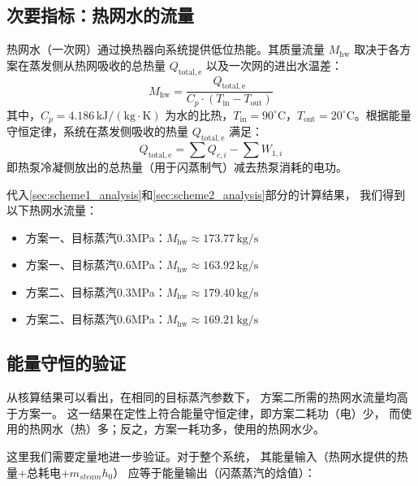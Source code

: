 \documentclass{thuemp}
\begin{document}
\subsection{次要指标：热网水的流量}
热网水（一次网）通过换热器向系统提供低位热能。其质量流量 $M_{\mathrm{hw}}$ 取决于各方案在蒸发侧从热网吸收的总热量 $Q_{\mathrm{total,e}}$ 以及一次网的进出水温差：\begin{equation}M_{\mathrm{hw}} = \frac{Q_{\mathrm{total,e}}}{C_p \cdot (T_{\mathrm{in}} - T_{\mathrm{out}})}\end{equation}其中，$C_p = 4.186\,\mathrm{kJ/(kg \cdot K)}$ 为水的比热，$T_{\mathrm{in}} = 90^\circ\mathrm{C}$，$T_{\mathrm{out}} = 20^\circ\mathrm{C}$。根据能量守恒定律，系统在蒸发侧吸收的热量 $Q_{\mathrm{total,e}}$ 满足：\begin{equation}Q_{\mathrm{total,e}} = \sum Q_{c,i} - \sum W_{1,i}\end{equation}即热泵冷凝侧放出的总热量（用于闪蒸制气）减去热泵消耗的电功。

代入\ref{sec:scheme1_analysis}和\ref{sec:scheme2_analysis}部分的计算结果，
我们得到以下热网水流量：
\begin{itemize}
    \item 方案一、目标蒸汽0.3MPa：$M_{\mathrm{hw}} \approx 173.77\,\mathrm{kg/s}$
    \item 方案一、目标蒸汽0.6MPa：$M_{\mathrm{hw}} \approx 163.92\,\mathrm{kg/s}$
    \item 方案二、目标蒸汽0.3MPa：$M_{\mathrm{hw}} \approx 179.40\,\mathrm{kg/s}$
    \item 方案二、目标蒸汽0.6MPa：$M_{\mathrm{hw}} \approx 169.21\,\mathrm{kg/s}$
\end{itemize}

\subsection{能量守恒的验证}
从核算结果可以看出，在相同的目标蒸汽参数下，
方案二所需的热网水流量均高于方案一。
这一结果在定性上符合能量守恒定律，即方案二耗功（电）少，
而使用的热网水（热）多；反之，方案一耗功多，使用的热网水少。

这里我们需要定量地进一步验证。对于整个系统，
其能量输入（热网水提供的热量+总耗电+$m_{steam}h_0$）
应等于能量输出（闪蒸蒸汽的焓值）：
\end{document}
